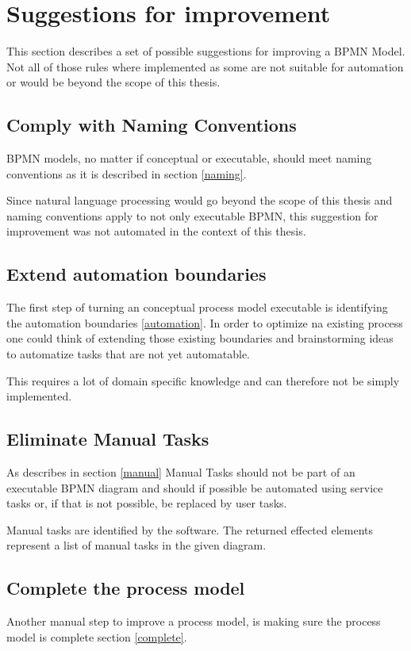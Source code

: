 \section{Suggestions for improvement}\label{last}
This section describes a set of possible suggestions for improving a BPMN Model. Not all of those rules where implemented as some are not suitable for automation or would be beyond the scope of this thesis. 

\subsection{Comply with Naming Conventions}
BPMN models, no matter if conceptual or executable, should meet naming conventions as it is described in section \ref{naming}. 

Since natural language processing would go beyond the scope of this thesis and naming conventions apply to not only executable BPMN, this suggestion for improvement was not automated in the context of this thesis.

\subsection{Extend automation boundaries}
The first step of turning an conceptual process model executable is identifying the automation boundaries \ref{automation}. In order to optimize na existing process one could think of extending those existing boundaries and brainstorming ideas to automatize tasks that are not yet automatable. 

This requires a lot of domain specific knowledge and can therefore not be simply implemented.

\subsection{Eliminate Manual Tasks}
As describes in section \ref{manual} Manual Tasks should not be part of an executable BPMN diagram and should if possible be automated using service tasks or, if that is not possible, be replaced by user tasks. 

Manual tasks are identified by the software. The returned effected elements represent a list of manual tasks in the given diagram.

\subsection{Complete the process model}
Another manual step to improve a process model, is making sure the process model is complete section \ref{complete}.

